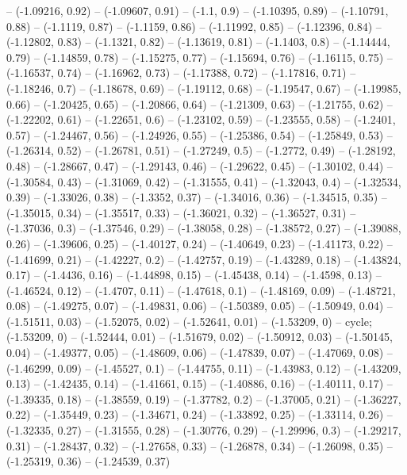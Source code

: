 -- (-1.09216, 0.92)
-- (-1.09607, 0.91)
-- (-1.1, 0.9)
-- (-1.10395, 0.89)
-- (-1.10791, 0.88)
-- (-1.1119, 0.87)
-- (-1.1159, 0.86)
-- (-1.11992, 0.85)
-- (-1.12396, 0.84)
-- (-1.12802, 0.83)
-- (-1.1321, 0.82)
-- (-1.13619, 0.81)
-- (-1.1403, 0.8)
-- (-1.14444, 0.79)
-- (-1.14859, 0.78)
-- (-1.15275, 0.77)
-- (-1.15694, 0.76)
-- (-1.16115, 0.75)
-- (-1.16537, 0.74)
-- (-1.16962, 0.73)
-- (-1.17388, 0.72)
-- (-1.17816, 0.71)
-- (-1.18246, 0.7)
-- (-1.18678, 0.69)
-- (-1.19112, 0.68)
-- (-1.19547, 0.67)
-- (-1.19985, 0.66)
-- (-1.20425, 0.65)
-- (-1.20866, 0.64)
-- (-1.21309, 0.63)
-- (-1.21755, 0.62)
-- (-1.22202, 0.61)
-- (-1.22651, 0.6)
-- (-1.23102, 0.59)
-- (-1.23555, 0.58)
-- (-1.2401, 0.57)
-- (-1.24467, 0.56)
-- (-1.24926, 0.55)
-- (-1.25386, 0.54)
-- (-1.25849, 0.53)
-- (-1.26314, 0.52)
-- (-1.26781, 0.51)
-- (-1.27249, 0.5)
-- (-1.2772, 0.49)
-- (-1.28192, 0.48)
-- (-1.28667, 0.47)
-- (-1.29143, 0.46)
-- (-1.29622, 0.45)
-- (-1.30102, 0.44)
-- (-1.30584, 0.43)
-- (-1.31069, 0.42)
-- (-1.31555, 0.41)
-- (-1.32043, 0.4)
-- (-1.32534, 0.39)
-- (-1.33026, 0.38)
-- (-1.3352, 0.37)
-- (-1.34016, 0.36)
-- (-1.34515, 0.35)
-- (-1.35015, 0.34)
-- (-1.35517, 0.33)
-- (-1.36021, 0.32)
-- (-1.36527, 0.31)
-- (-1.37036, 0.3)
-- (-1.37546, 0.29)
-- (-1.38058, 0.28)
-- (-1.38572, 0.27)
-- (-1.39088, 0.26)
-- (-1.39606, 0.25)
-- (-1.40127, 0.24)
-- (-1.40649, 0.23)
-- (-1.41173, 0.22)
-- (-1.41699, 0.21)
-- (-1.42227, 0.2)
-- (-1.42757, 0.19)
-- (-1.43289, 0.18)
-- (-1.43824, 0.17)
-- (-1.4436, 0.16)
-- (-1.44898, 0.15)
-- (-1.45438, 0.14)
-- (-1.4598, 0.13)
-- (-1.46524, 0.12)
-- (-1.4707, 0.11)
-- (-1.47618, 0.1)
-- (-1.48169, 0.09)
-- (-1.48721, 0.08)
-- (-1.49275, 0.07)
-- (-1.49831, 0.06)
-- (-1.50389, 0.05)
-- (-1.50949, 0.04)
-- (-1.51511, 0.03)
-- (-1.52075, 0.02)
-- (-1.52641, 0.01)
-- (-1.53209, 0)
-- cycle;
\drawBand (-1.53209, 0)
-- (-1.52444, 0.01)
-- (-1.51679, 0.02)
-- (-1.50912, 0.03)
-- (-1.50145, 0.04)
-- (-1.49377, 0.05)
-- (-1.48609, 0.06)
-- (-1.47839, 0.07)
-- (-1.47069, 0.08)
-- (-1.46299, 0.09)
-- (-1.45527, 0.1)
-- (-1.44755, 0.11)
-- (-1.43983, 0.12)
-- (-1.43209, 0.13)
-- (-1.42435, 0.14)
-- (-1.41661, 0.15)
-- (-1.40886, 0.16)
-- (-1.40111, 0.17)
-- (-1.39335, 0.18)
-- (-1.38559, 0.19)
-- (-1.37782, 0.2)
-- (-1.37005, 0.21)
-- (-1.36227, 0.22)
-- (-1.35449, 0.23)
-- (-1.34671, 0.24)
-- (-1.33892, 0.25)
-- (-1.33114, 0.26)
-- (-1.32335, 0.27)
-- (-1.31555, 0.28)
-- (-1.30776, 0.29)
-- (-1.29996, 0.3)
-- (-1.29217, 0.31)
-- (-1.28437, 0.32)
-- (-1.27658, 0.33)
-- (-1.26878, 0.34)
-- (-1.26098, 0.35)
-- (-1.25319, 0.36)
-- (-1.24539, 0.37)
